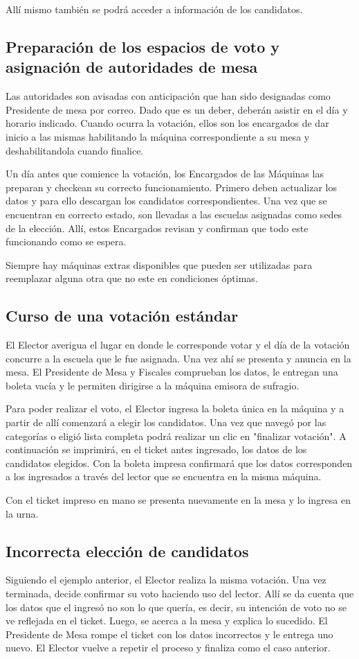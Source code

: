 \documentclass[spanish, 10pt,a4paper]{article}
\numberwithin{equation}{section} %
\begin{document}
	Allí mismo también se podrá acceder a información de los candidatos.

\subsection{Preparación de los espacios de voto y asignación de autoridades de mesa}
	Las autoridades son avisadas con anticipación que han sido designadas como Presidente de mesa por correo. Dado que es un deber, deberán asistir en el día y horario indicado. Cuando ocurra la votación, ellos son los encargados de dar inicio a las mismas habilitando la máquina correspondiente a su mesa y deshabilitandola cuando finalice.		
	
	Un día antes que comience la votación, los Encargados de las Máquinas las preparan y checkean su correcto funcionamiento. Primero deben actualizar los datos y para ello descargan los candidatos correspondientes. Una vez que se encuentran en correcto estado, son llevadas a las escuelas asignadas como sedes de la elección. Allí, estos Encargados revisan y confirman que todo este funcionando como se espera. 
	
	Siempre hay máquinas extras disponibles que pueden ser utilizadas para reemplazar alguna otra que no este en condiciones óptimas.
	

\subsection{Curso de una votación estándar}
	El Elector averigua el lugar en donde le corresponde votar y el día de la votación concurre a la escuela que le fue asignada. Una vez ahí se presenta y anuncia en la mesa. El Presidente de Mesa y Fiscales comprueban los datos, le entregan una boleta vacía y le permiten dirigirse a la máquina emisora de sufragio. 

	Para poder realizar el voto, el Elector ingresa la boleta única en la máquina y a partir de allí comenzará a elegir los candidatos. Una vez que navegó por las categorías o eligió lista completa podrá  realizar un clic en "finalizar votación". A continuación se imprimirá, en el ticket antes ingresado, los datos de los candidatos elegidos. Con la boleta impresa confirmará que los datos corresponden a los ingresados a través del lector que se encuentra en la misma máquina.

	Con el ticket impreso en mano se presenta nuevamente en la mesa y lo ingresa en la urna.	
	
\subsection{Incorrecta elección de candidatos}
	Siguiendo el ejemplo anterior, el Elector realiza la misma votación. Una vez terminada, decide confirmar su voto haciendo uso del lector. Allí se da cuenta que los datos que el ingresó no son lo que quería, es decir, su intención de voto no se ve reflejada en el ticket. Luego, se acerca a la mesa y explica lo sucedido. El Presidente de Mesa rompe el ticket con los datos incorrectos y le entrega uno nuevo. El Elector vuelve a repetir el proceso y finaliza como el caso anterior. 
\end{document}
